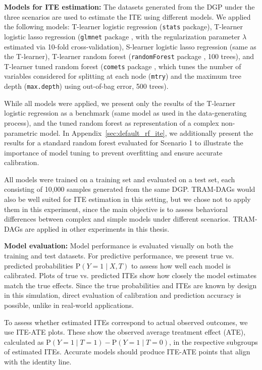 \textbf{Models for ITE estimation:} The datasets generated from the DGP under the three scenarios are used to estimate the ITE using different models. We applied the following models: T-learner logistic regression (\texttt{stats} package), T-learner logistic lasso regression (\texttt{glmnet} package \citep{friedman2010}, with the regularization parameter $\lambda$ estimated via 10-fold cross-validation), S-learner logistic lasso regression (same as the T-learner), T-learner random forest (\texttt{randomForest} package \citep{breiman2001}, 100 trees), and T-learner tuned random forest (\texttt{comets} package \citep{comets}, which tunes the number of variables considered for splitting at each node (\texttt{mtry}) and the maximum tree depth (\texttt{max.depth}) using out-of-bag error, 500 trees). 

While all models were applied, we present only the results of the T-learner logistic regression as a benchmark (same model as used in the data-generating process), and the tuned random forest as representation of a complex non-parametric model. In Appendix~\ref{sec:default_rf_ite}, we additionally present the results for a standard random forest evaluated for Scenario 1 to illustrate the importance of model tuning to prevent overfitting and ensure accurate calibration.

All models were trained on a training set and evaluated on a test set, each consisting of 10,000 samples generated from the same DGP. TRAM-DAGs would also be well suited for ITE estimation in this setting, but we chose not to apply them in this experiment, since the main objective is to assess behavioral differences between complex and simple models under different scenarios. TRAM-DAGs are applied in other experiments in this thesis.

\medskip

\textbf{Model evaluation:} Model performance is evaluated visually on both the training and test datasets. For predictive performance, we present true vs. predicted probabilities $\text{P}(Y = 1 \mid X, T)$ to assess how well each model is calibrated. Plots of true vs. predicted ITEs show how closely the model estimates match the true effects. Since the true probabilities and ITEs are known by design in this simulation, direct evaluation of calibration and prediction accuracy is possible, unlike in real-world applications.

To assess whether estimated ITEs correspond to actual observed outcomes, we use ITE-ATE plots. These show the observed average treatment effect (ATE), calculated as $\text{P}(Y = 1 \mid T = 1) - \text{P}(Y = 1 \mid T = 0)$, in the respective subgroups of estimated ITEs. Accurate models should produce ITE-ATE points that align with the identity line.

